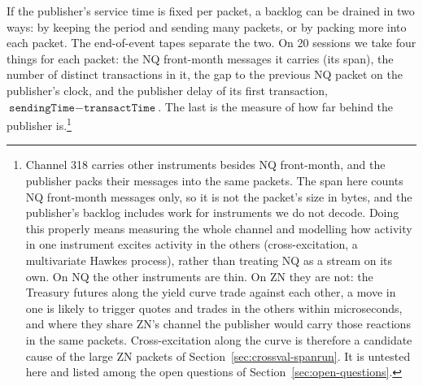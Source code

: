 \documentclass[11pt]{article}
\begin{document}
If the publisher's service time is fixed per packet, a backlog can be drained in two ways:
by keeping the period and sending many packets, or by packing more into each packet. The
end-of-event tapes separate the two. On 20 sessions we take four things for each packet: the NQ front-month messages it
carries (its span), the number of distinct transactions in it, the gap to the previous NQ
packet on the publisher's clock, and the publisher delay of its first transaction,
$\texttt{sendingTime} - \texttt{transactTime}$. The last is the measure of how far behind
the publisher is.\footnote{Channel 318 carries other
instruments besides NQ front-month, and the publisher packs their messages into the same
packets. The span here counts NQ front-month messages only, so it is not the packet's
size in bytes, and the publisher's backlog includes work for instruments we do not
decode. Doing this properly means measuring the whole channel and modelling how activity
in one instrument excites activity in the others (cross-excitation, a multivariate
Hawkes process), rather than treating NQ as a stream on its own. On NQ the other
instruments are thin. On ZN they are not: the Treasury futures along the yield curve
trade against each other, a move in one is likely to trigger quotes and trades in the
others within microseconds, and where they share ZN's channel the publisher would carry
those reactions in the same packets. Cross-excitation along the curve is therefore a
candidate cause of the large ZN packets of Section~\ref{sec:crossval-spanrun}. It is
untested here and listed among the open questions of Section~\ref{sec:open-questions}.}
\end{document}
